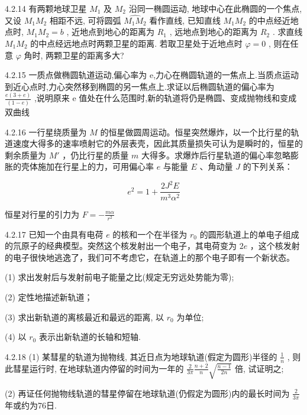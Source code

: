 \begin{problem}{4.2.14}
有两颗地球卫星 $M_{1}$ 及 $M_{2}$ 沿同一椭圆运动, 地球中心在此椭圆的一个焦点, 又设 $M_{1}M_{2}$ 相距不远, 可将圆弧 $\widehat{M_{1}M_{2}}$ 看作直线, 已知直线 $M_{1}M_{2}$ 的中点经近地点时, $M_{1}M_{2}=b$ , 近地点到地心的距离为 $R_{1}$ , 远地点到地心的距离为 $R_{2}$ . 求直线 $M_{1}M_{2}$ 的中点经远地点时两颗卫星的距离. 若取卫星处于近地点时 $\varphi=0$ , 则在任意 $\varphi$ 角时, 两颗卫星的距离多大?
\end{problem}
\clearpage


\begin{problem}{4.2.15}
一质点做椭圆轨道运动,偏心率为 e,力心在椭圆轨道的一焦点上.当质点运动到近心点时,力心突然移到椭圆的另一焦点上.求证以后椭圆轨道的偏心率为 $\frac{e(3+e)}{(1-e)}$ ,说明原来 e 值处在什么范围时,新的轨道将仍是椭圆、变成抛物线和变成双曲线
\end{problem}
\clearpage


\begin{problem}{4.2.16}
一行星绕质量为 $M$ 的恒星做圆周运动。恒星突然爆炸，以一个比行星的轨道速度大得多的速率喷射它的外层表壳，因此其质量损失可认为是瞬时的，恒星的剩余质量为 $M'$ ，仍比行星的质量 $m$ 大得多。求爆炸后行星轨道的偏心率忽略膨胀的壳体施加在行星上的力，可用偏心率 $e$ 与能量 $E$ 、角动量 $J$ 的下列关系：

\[
e ^ {2} = 1 + \frac {2 J ^ {2} E}{m ^ {3} \alpha^ {2}}
\]

恒星对行星的引力为 $F = -\frac{m\alpha}{r^2}$
\end{problem}
\clearpage


\begin{problem}{4.2.17}
已知一个由具有电荷 $e$ 的核和一个在半径为 $r_0$ 的圆形轨道上的单电子组成的氘原子的经典模型。突然这个核发射出一个电子，其电荷变为 $2e$ ，这个核发射的电子很快地逃逸了，我们可不考虑它，在轨道上的那个电子即有一个新状态。

(1) 求出发射后与发射前电子能量之比(规定无穷远处势能为零);

(2) 定性地描述新轨道；

(3) 求出新轨道的离核最近和最远的距离, 以 $r_{0}$ 为单位;

(4) 以 $r_{0}$ 表示出新轨道的长轴和短轴.
\end{problem}
\clearpage


\begin{problem}{4.2.18}
(1) 某彗星的轨道为抛物线, 其近日点为地球轨道(假定为圆形)半径的 $\frac{1}{n}$ , 则此彗星运行时, 在地球轨道内停留的时间为一年的 $\frac{2}{3\pi} \frac{n+2}{n} \sqrt{\frac{n-1}{2n}}$ 倍, 试证明之;

(2) 再证任何抛物线轨道的彗星停留在地球轨道(仍假定为圆形)内的最长时间为 $\frac{2}{3\pi}$ 年或约为76日.
\end{problem}
\clearpage


